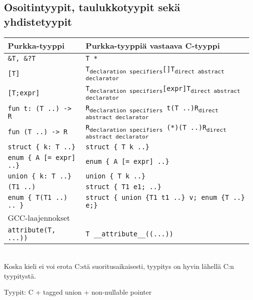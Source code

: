 \subsection{Osoitintyypit, taulukkotyypit sekä yhdistetyypit}

\begin{tabular}{@{}ll@{}} \toprule
    Purkka-tyyppi & Purkka-tyyppiä vastaava C-tyyppi \\ \midrule
    \texttt{\&T, \&?T} & \texttt{T *} \\
    [0.2cm]

    \texttt{[T]} & \texttt{T\textsubscript{declaration specifiers}[]T\textsubscript{direct abstract declarator}} \\
    \texttt{[T;expr]} & \texttt{T\textsubscript{declaration specifiers}[expr]T\textsubscript{direct abstract declarator}} \\
    [0.2cm]

    \texttt{fun t: (T ..) -> R} & \texttt{R\textsubscript{declaration specifiers}~t(T ..)R\textsubscript{direct abstract declarator}} \\
    \texttt{fun (T ..) -> R} & \texttt{R\textsubscript{declaration specifiers}~(*)(T ..)R\textsubscript{direct abstract declarator}} \\
    [0.2cm]

    \texttt{struct \{ k: T ..\}} & \texttt{struct \{ T k ..\}} \\
    \texttt{enum \{ A [= expr] ..\}} & \texttt{enum \{ A [= expr] ..\}} \\
    \texttt{union \{ k: T ..\}} & \texttt{union \{ T k ..\}} \\
    [0.2cm]

    \texttt{(T1 ..)} & \texttt{struct \{ T1 e1; ..\}} \\
    \texttt{enum \{ T(T1 ..) .. \}} & \texttt{struct \{ union \{T1 t1 ..\} v; enum \{T ..\} e;\}} \\
    [0.2cm]

    GCC-laajennokset & \\
    \texttt{attribute(T, ...))} & \texttt{T \_\_attribute\_\_((...))} \\

    \bottomrule
\end{tabular} \\

Koska kieli ei voi erota C:stä suoritusaikaisesti, tyypitys on hyvin lähellä
C:n tyypitystä.

Tyypit:
 C + tagged union + non-nullable pointer

